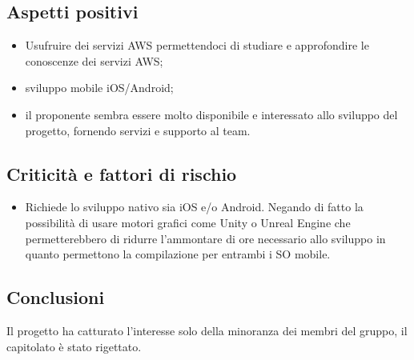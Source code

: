 \subsection{Aspetti positivi}
\begin{itemize}
    \item Usufruire dei servizi AWS permettendoci di studiare e approfondire le conoscenze dei servizi AWS;
    \item sviluppo mobile iOS/Android;
    \item il proponente sembra essere molto disponibile e interessato allo sviluppo del progetto, fornendo servizi e supporto al team.
\end{itemize}
\subsection{Criticità e fattori di rischio}
\begin{itemize}
    \item Richiede lo sviluppo nativo sia iOS e/o Android. Negando di fatto la possibilità di usare motori grafici come Unity o Unreal Engine che permetterebbero di ridurre l'ammontare di ore necessario allo sviluppo in quanto permettono la compilazione per entrambi i SO mobile.
\end{itemize}
\subsection{Conclusioni}
Il progetto ha catturato l'interesse solo della minoranza dei membri del gruppo, il capitolato è stato rigettato.